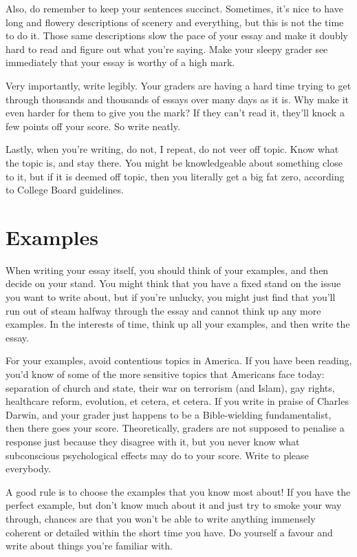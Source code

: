 \documentclass[DIV=calc,11pt,parskip,numbers=noenddot]{scrartcl} %
\begin{document}
Also, do remember to keep your sentences succinct. Sometimes, it’s nice to have long and flowery descriptions of scenery and everything, but this is not the time to do it. Those same descriptions slow the pace of your essay and make it doubly hard to read and figure out what you’re saying. Make your sleepy grader see immediately that your essay is worthy of a high mark.

Very importantly, write legibly. Your graders are having a hard time trying to get through thousands and thousands of essays over many days as it is. Why make it even harder for them to give you the mark? If they can’t read it, they’ll knock a few points off your score. So write neatly.

Lastly, when you’re writing, do not, I repeat, do not veer off topic. Know what the topic is, and stay there. You might be knowledgeable about something close to it, but if it is deemed off topic, then you literally get a big fat zero, according to College Board guidelines.
\section{Examples}
When writing your essay itself, you should think of your examples, and then decide on your stand. You might think that you have a fixed stand on the issue you want to write about, but if you’re unlucky, you might just find that you’ll run out of steam halfway through the essay and cannot think up any more examples. In the interests of time, think up all your examples, and then write the essay.

For your examples, avoid contentious topics in America. If you have been reading, you’d know of some of the more sensitive topics that Americans face today: separation of church and state, their war on terrorism (and Islam), gay rights, healthcare reform, evolution, et cetera, et cetera. If you write in praise of Charles Darwin, and your grader just happens to be a Bible-wielding fundamentalist, then there goes your score. Theoretically, graders are not supposed to penalise a response just because they disagree with it, but you never know what subconscious psychological effects may do to your score. Write to please everybody.

A good rule is to choose the examples that you know most about! If you have the perfect example, but don’t know much about it and just try to smoke your way through, chances are that you won’t be able to write anything immensely coherent or detailed within the short time you have. Do yourself a favour and write about things you’re familiar with.
\end{document}
